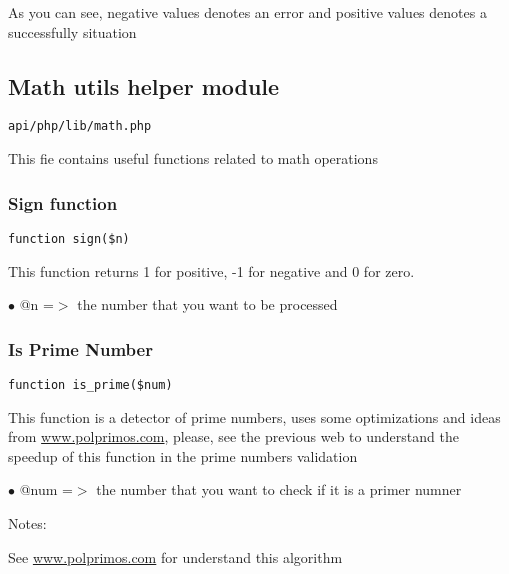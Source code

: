 \documentclass[a4paper]{article}
\def\htmladdnormallink#1#2{\href{#2}{#1}}
\begin{document}
As you can see, negative values denotes an error and positive values denotes a successfully situation

\hypertarget{toc493}{}
\subsection{Math utils helper module}

\begin{lstlisting}
api/php/lib/math.php
\end{lstlisting}

This fie contains useful functions related to math operations

\hypertarget{toc494}{}
\subsubsection{Sign function}

\begin{lstlisting}
function sign($n)
\end{lstlisting}

This function returns 1 for positive, -1 for negative and 0 for zero.

\begin{compactitem}
\item[\color{myblue}$\bullet$] @n =$>$ the number that you want to be processed
\end{compactitem}

\hypertarget{toc495}{}
\subsubsection{Is Prime Number}

\begin{lstlisting}
function is_prime($num)
\end{lstlisting}

This function is a detector of prime numbers, uses some optimizations and
ideas from \htmladdnormallink{www.polprimos.com}{www.polprimos.com}, please, see the previous web to understand
the speedup of this function in the prime numbers validation

\begin{compactitem}
\item[\color{myblue}$\bullet$] @num =$>$ the number that you want to check if it is a primer numner
\end{compactitem}

Notes:

See \htmladdnormallink{www.polprimos.com}{www.polprimos.com} for understand this algorithm
\end{document}

